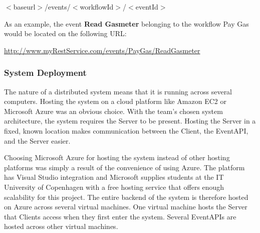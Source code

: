 \begin{center}
$<$baseurl$>$/events/$<$workflowId$>$/$<$eventId$>$
\end{center}

As an example, the event \textbf{Read Gasmeter} belonging to the workflow Pay Gas would be located on the following URL:  

\begin{center}
\url{http://www.myRestService.com/events/PayGas/ReadGasmeter}
\end{center}

\subsubsection{System Deployment}
The nature of a distributed system means that it is running across several computers. Hosting the system on a cloud platform like Amazon EC2 or Microsoft Azure was an obvious choice. With the team’s chosen system architecture, the system requires the Server to be present. Hosting the Server in a fixed, known location makes communication between the Client, the EventAPI, and the Server easier. 

Choosing Microsoft Azure for hosting the system instead of other hosting platforms was simply a result of the convenience of using Azure. The platform has Visual Studio integration and Microsoft supplies students at the IT University of Copenhagen with a free hosting service that offers enough scalability for this project. The entire backend of the system is therefore hosted on Azure across several virtual machines. One virtual machine hosts the Server that Clients access when they first enter the system. Several EventAPIs are hosted across other virtual machines. 